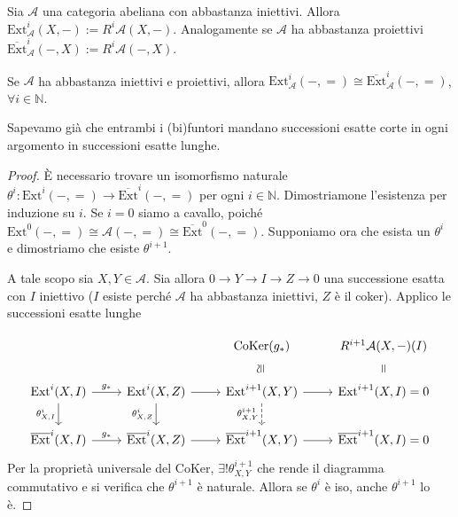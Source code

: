 Sia \(\mathcal{A}\) una categoria abeliana con abbastanza iniettivi. Allora
\(\mathrm{Ext}_\mathcal{A}^{i}{(X, -)} := R^{i}\mathcal{A}{(X, -)}\).
Analogamente se \(\mathcal{A}\) ha abbastanza proiettivi
\(\overline{\mathrm{Ext}}_{\mathcal{A}} ^{i}{(-, X)} := R^{i}\mathcal{A}{(-,
X)}\).

\begin{theorem}{}
    Se \(\mathcal{A}\) ha abbastanza iniettivi e proiettivi, allora
    \(\mathrm{Ext}_\mathcal{A}^{i} {(-, =)} \cong
    \overline{\mathrm{Ext}}_\mathcal{A}^{i} {(-, =)}\), \(\forall i \in
    \mathbb{N}\).
\end{theorem}
\begin{remark}{}
    Sapevamo già che entrambi i (bi)funtori mandano successioni esatte corte in
    ogni argomento in successioni esatte lunghe.
\end{remark}
\begin{proof}{}
    È necessario trovare un isomorfismo naturale \(\theta^{i} :
    \mathrm{Ext}^{i}{(-, =)} \to \overline{\mathrm{Ext}}^{i}{(-, =)}\) per ogni \(i \in
    \mathbb{N}\). Dimostriamone l'esistenza per induzione su \(i\). Se \(i=0\)
    siamo a cavallo, poiché \(\mathrm{Ext}^{0}{(-, =)} \cong \mathcal{A}{(-, =)}
    \cong \overline{\mathrm{Ext}}^{0}{(-, =)}\). Supponiamo ora che esista un
    \(\theta^{i}\) e dimostriamo che esiste \(\theta^{i+1}\).

    A tale scopo sia \(X, Y \in \mathcal{A}\). Sia allora \(0 \to Y \to I \to Z
    \to 0\) una successione esatta con \(I\) iniettivo (\(I\) esiste perché
    \(\mathcal{A}\) ha abbastanza iniettivi, \(Z\) è il coker). Applico le
    successioni esatte lunghe

\[\begin{tikzcd}
    && \mathrm{CoKer}{(g_*)} & R^{i+1} \mathcal{A}{(X, -)}{(I)} \\
	\mathrm{Ext}^{i}{(X,I)} & \mathrm{Ext}^{i}{(X,Z)} &
    \mathrm{Ext}^{i+1}{(X,Y)} & \mathrm{Ext}^{i+1}{(X,I)} = 0 \\
	\overline{\mathrm{Ext}}^{i}{(X,I)} & \overline{\mathrm{Ext}}^{i}{(X,Z)} &
    \overline{\mathrm{Ext}}^{i+1}{(X,Y)} & \overline{\mathrm{Ext}}^{i+1}{(X,I)}
    = 0
	\arrow["{g_*}", from=2-1, to=2-2]
	\arrow["{\theta^i_{X,I}}"', from=2-1, to=3-1]
	\arrow[from=2-2, to=2-3]
	\arrow["{\theta^i_{X,Z}}"', from=2-2, to=3-2]
	\arrow["\cong"{marking, allow upside down}, draw=none, from=2-3, to=1-3]
	\arrow[from=2-3, to=2-4]
	\arrow["{\theta^{i+1}_{X,Y}}"', dashed, from=2-3, to=3-3]
	\arrow["{=}"{marking, allow upside down}, draw=none, from=2-4, to=1-4]
	\arrow["{g_*}", from=3-1, to=3-2]
	\arrow[from=3-2, to=3-3]
	\arrow[from=3-3, to=3-4]
\end{tikzcd}\]
    Per la proprietà universale del \(\mathrm{CoKer}\), \(\exists !
    \theta^{i+1}_{X,Y} \) che rende il diagramma commutativo e si verifica che
    \(\theta^{i+1}\) è naturale. Allora se \(\theta^{i}\) è iso, anche
    \(\theta^{i+1}\) lo è.
\end{proof}

